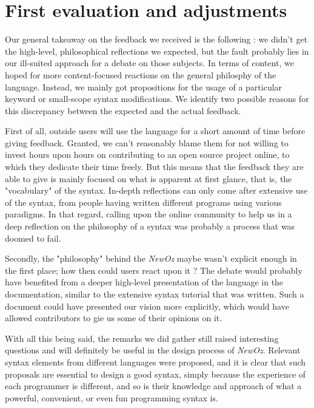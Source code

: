 \section{First evaluation and adjustments}\label{sec:ch4-adjustments}
Our general takeaway on the feedback we received is the following : we didn't get the high-level, philosophical reflections we expected, but the fault probably lies in our ill-suited approach for a debate on those subjects.\newline
In terms of content, we hoped for more content-focused reactions on the general philosphy of the language.
Instead, we mainly got propositions for the usage of a particular keyword or small-scope syntax modifications.
We identify two possible reasons for this discrepancy between the expected and the actual feedback.\newline

First of all, outside users will use the language for a short amount of time before giving feedback.
Granted, we can't reasonably blame them for not willing to invest hours upon hours on contributing to an open source project online, to which they dedicate their time freely.
But this means that the feedback they are able to give is mainly focused on what is apparent at first glance, that is, the "vocabulary" of the syntax.
In-depth reflections can only come after extensive use of the syntax, from people having written different programs using various paradigms.
In that regard, calling upon the online community to help us in a deep reflection on the philosophy of a syntax was probably a process that was doomed to fail.\newline

Secondly, the "philosophy" behind the \textit{NewOz} maybe wasn't explicit enough in the first place;
how then could users react upon it ?
The debate would probably have benefited from a deeper high-level presentation of the language in the documentation, similar to the extensive syntax tutorial that was written.
Such a document could have presented our vision more explicitly, which would have allowed contributors to gie us some of their opinions on it.\newline

With all this being said, the remarks we did gather still raised interesting questions and will definitely be useful in the design process of \textit{NewOz}.
Relevant syntax elements from different languages were proposed, and it is clear that such proposals are essential to design a good syntax, simply because the experience of each programmer is different, and so is their knowledge and approach of what a powerful, convenient, or even fun programming syntax is.

